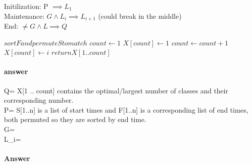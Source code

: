 \documentclass{article}
\begin{document}
Initilization: P $\implies L_{1}$ \\
Maintenance: $G \wedge L_{i} \implies L_{i+1}$ (could break in the middle) \\
End: $\neq G \wedge L \implies Q$

\begin{algorithmic}[1]
    \State$ sort F and permute S to match$
    \State$ count \gets 1$
    \State$ X [count] \gets 1$
            \State$ count \gets count + 1$
            \State$ X [count] \gets i$
        \EndIf{}
    \EndFor{}
    \State$ return X [1 .. count]$
\end{algorithmic}

\paragraph{answer}

Q= X[1 .. count] contains the optimal/largest number of classes and their corresponding number.\\
P= S[1..n] is a list of start times and F[1..n] is a corresponding list of end times, both permuted
so they are sorted by end time.\\
G= \\
L_{i}=

\paragraph{Answer}

\todo{}
\end{document}
